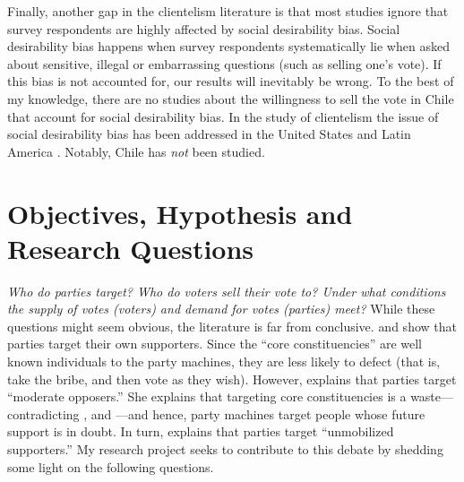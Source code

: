 \documentclass[onesided]{article}\usepackage[]{graphicx}\usepackage[]{color}
\begin{document}
Finally, another gap in the clientelism literature is that most studies ignore that survey respondents are highly affected by social desirability bias. Social desirability bias happens when survey respondents systematically lie when asked about sensitive, illegal or embarrassing questions (such as selling one's vote). If this bias is not accounted for, our results will inevitably be wrong. To the best of my knowledge, there are no studies about the willingness to sell the vote in Chile that account for social desirability bias. In the study of clientelism the issue of social desirability bias has been addressed in the United States \parencite{Bahamonde2020a} and Latin America \parencite{GonzalezOcantos2014,Gonzalez-Ocantos2012}. Notably, Chile has \emph{not} been studied. 



\section{Objectives, Hypothesis and Research Questions}

\emph{Who do parties target? Who do voters sell their vote to? Under what conditions the supply of votes (voters) and demand for votes (parties) meet?} While these questions might seem obvious, the literature is far from conclusive. \textcite[]{Dixit1996} and \textcite[]{Cox1986} show that parties target their own supporters. Since the ``core constituencies'' are well known individuals to the party machines, they are less likely to defect (that is, take the bribe, and then vote as they wish). However, \textcite[]{Stokes2005} explains that parties target ``moderate opposers.'' She explains that targeting core constituencies is a waste---contradicting \textcite[]{Dixit1996}, and \textcite[]{Cox1986}---and hence, party machines target people whose future support is in doubt. In turn, \textcite[]{Nichter2008} explains that parties target ``unmobilized supporters.'' My research project seeks to contribute to this debate by shedding some light on the following questions.





\end{document}
